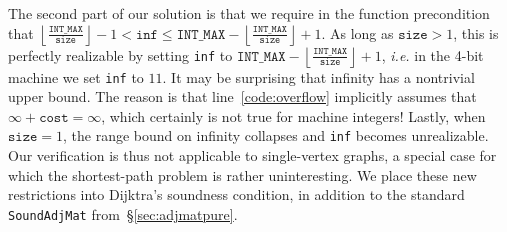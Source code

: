 The second part of our solution is that we require in the function precondition that $\left\lfloor \frac{\texttt{INT\_MAX}}{\texttt{size}} \right\rfloor - 1 < \texttt{inf} \le \texttt{INT\_MAX} - \left\lfloor \frac{\texttt{INT\_MAX}}{\texttt{size}} \right\rfloor + 1$.  As long as $\texttt{size} > 1$, this is perfectly realizable  by setting \texttt{inf} to $\texttt{INT\_MAX} - \left\lfloor \frac{\texttt{INT\_MAX}}{\texttt{size}} \right\rfloor + 1$, \emph{i.e.} in the 4-bit machine we set \texttt{inf} to $11$.  It may be surprising that infinity has a nontrivial upper bound.  The reason is that line~\ref{code:overflow} implicitly assumes that $\infty + \texttt{cost} = \infty$, which certainly is not true for machine integers!
Lastly, when $\texttt{size} = 1$, the range bound on infinity collapses and \texttt{inf} becomes unrealizable.
Our verification is thus not applicable to single-vertex graphs, a special case for which the shortest-path problem is rather uninteresting. We place these new 
restrictions into Dijktra's soundness condition, in addition to the standard
\texttt{SoundAdjMat} from~\S\ref{sec:adjmatpure}.

